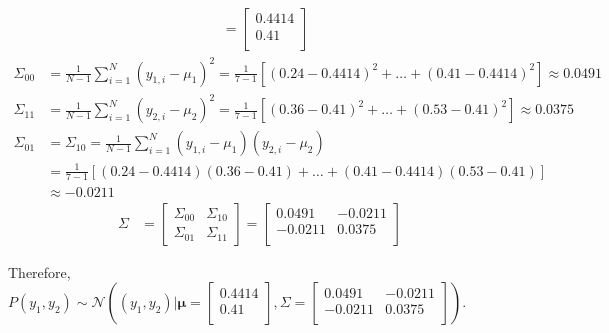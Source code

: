 \documentclass[12pt]{article}
\begin{document}
\begin{enumerate}[leftmargin=\labelsep]
\begin{enumerate}
$$\begin{aligned}
                                                                                                                   & = \begin{bmatrix}0.4414 \\0.41 \\\end{bmatrix}
                  \end{aligned}
                $$
                $$
                  \begin{aligned}
                    \Sigma_{00} & = \frac{1}{N-1} \sum^{N}_{i=1} (y_{1,i} - \mu_{1})^2 = \frac{1}{7-1} \left[(0.24-0.4414)^2 + \dots + (0.41-0.4414)^2\right] \approx 0.0491 \\
                    \Sigma_{11} & = \frac{1}{N-1} \sum^{N}_{i=1} (y_{2,i} - \mu_{2})^2 = \frac{1}{7-1} \left[(0.36-0.41)^2 + \dots + (0.53-0.41)^2\right] \approx 0.0375     \\
                    \Sigma_{01} & = \Sigma_{10} = \frac{1}{N-1} \sum^{N}_{i=1} (y_{1,i} - \mu_{1})(y_{2,i} - \mu_{2})                                                        \\
                                & = \frac{1}{7-1} \left[(0.24-0.4414)(0.36-0.41) + \dots + (0.41-0.4414)(0.53-0.41)\right]                                                   \\
                                & \approx -0.0211
                  \end{aligned}
                $$
                $$
                  \begin{aligned}
                    \Sigma & = \begin{bmatrix}\Sigma_{00} & \Sigma_{10}\\ \Sigma_{01} & \Sigma_{11}\end{bmatrix} = \begin{bmatrix}0.0491 & -0.0211 \\-0.0211 & 0.0375 \\\end{bmatrix}
                  \end{aligned}
                $$

                Therefore, $P(y_1, y_2) \sim \mathcal{N}\left((y_1, y_2) | \boldsymbol{\mu} = \begin{bmatrix}0.4414 \\0.41 \\\end{bmatrix},
                  \Sigma = \begin{bmatrix}0.0491 & -0.0211 \\-0.0211 & 0.0375 \\\end{bmatrix}\right)$.


\end{enumerate}
\end{enumerate}
\end{document}
